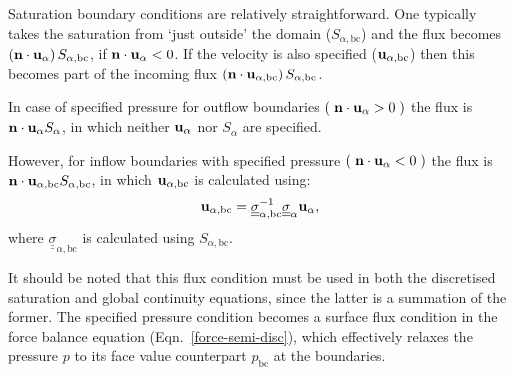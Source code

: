 \documentclass[times]{fldauth}
\begin{document}
Saturation boundary conditions are relatively straightforward. One
typically takes the saturation from `just outside' the domain
($S_{\alpha, \text{bc}}$) and the flux becomes $\left({\bf n}\cdot
{\bf u}_{\alpha}\right)S_{\alpha,\text{bc}}$, if ${\bf n}\cdot {\bf
  u}_{\alpha} < 0$. If the velocity is also specified (${\bf
  u}_{\alpha,\text{bc}}$) then this becomes part of the incoming flux
$\left({\bf n}\cdot {\bf
  u}_{\alpha,\text{bc}}\right)S_{\alpha,\text{bc}}$.

In case of specified pressure for outflow boundaries
$\left(\right.{\bf n}\cdot {\bf u}_\alpha>0\left.\right)$ the flux is
${\bf n}\cdot {\bf u}_\alpha {S_\alpha}$, in which neither ${\bf
  u}_\alpha$ nor ${S_\alpha}$ are specified.

However, for inflow boundaries with specified pressure
$\left(\right.{\bf n}\cdot {\bf u}_\alpha<0\left.\right)$ the flux is
${\bf n}\cdot {\bf u}_{\alpha,\text{bc}} S_{\alpha,\text{bc}}$, in
which ${\bf u}_{\alpha,\text{bc}}$ is calculated using:
\begin{equation}
  {\bf u}_{\alpha,\text{bc}} = 
    \underline{\underline{\sigma}}_{\alpha,\text{bc}} ^{-1}
    \underline{\underline{\sigma}}_{\alpha}  
              {\bf u}_{\alpha},
\end{equation}
where $\underline{\underline{\sigma}}_{\alpha,\text{bc}}$ is
calculated using $S_{\alpha,\text{bc}}$.

It should be noted that this flux condition must be used in both the
discretised saturation and global continuity equations, since the
latter is a summation of the former. The specified pressure condition
becomes a surface flux condition in the force balance equation
(Eqn.~\ref{force-semi-disc}), which effectively relaxes the pressure
$p$ to its face value counterpart $p_\text{bc}$ at the boundaries.
\end{document}
